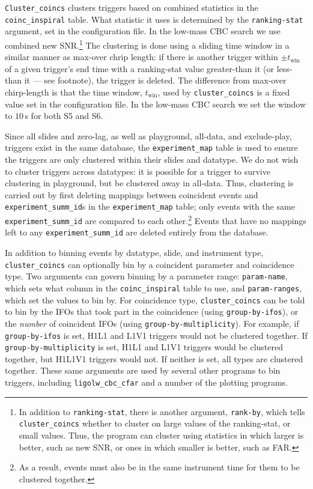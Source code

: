 \verb|Cluster_coincs| clusters triggers based on combined statistics in the \verb|coinc_inspiral| table. What statistic it uses is determined by the \verb|ranking-stat| argument, set in the configuration file. In the low-mass \ac{CBC} search we use combined new \ac{SNR}.\footnote{In addition to \texttt{ranking-stat}, there is another argument, \texttt{rank-by}, which tells \texttt{cluster\_coincs} whether to cluster on large values of the ranking-stat, or small values. Thus, the program can cluster using statistics in which larger is better, such as new \ac{SNR}, or ones in which smaller is better, such as \ac{FAR}.} The clustering is done using a sliding time window in a similar manner as max-over chrip length: if there is another trigger within $\pm t_{\mathrm{win}}$ of a given trigger's end time with a ranking-stat value greater-than it (or less-than it --- see footnote), the trigger is deleted. The difference from max-over chirp-length is that the time window, $t_{\mathrm{win}}$, used by \verb|cluster_coincs| is a fixed value set in the configuration file. In the low-mass \ac{CBC} search we set the window to $10\,$s for both \ac{S5} and \ac{S6}.

Since all slides and zero-lag, as well as playground, all-data, and exclude-play, triggers exist in the same database, the \verb|experiment_map| table is used to ensure the triggers are only clustered within their slides and datatype. We do not wish to cluster triggers across datatypes: it is possible for a trigger to survive clustering in playground, but be clustered away in all-data. Thus, clustering is carried out by first deleting mappings between coincident events and \verb|experiment_summ_id|s in the \verb|experiment_map| table; only events with the same \verb|experiment_summ_id| are compared to each other.\footnote{As a result, events must also be in the same instrument time for them to be clustered together.} Events that have no mappings left to any \verb|experiment_summ_id| are deleted entirely from the database.

In addition to binning events by datatype, slide, and instrument type, \verb|cluster_coincs| can optionally bin by a coincident parameter and coincidence type. Two arguments can govern binning by a parameter range: \verb|param-name|, which sets what column in the \verb|coinc_inspiral| table to use, and \verb|param-ranges|, which set the values to bin by. For coincidence type, \verb|cluster_coincs| can be told to bin by the \acp{IFO} that took part in the coincidence (using \verb|group-by-ifos|), or the \emph{number} of coincident \acp{IFO} (using \verb|group-by-multiplicity|). For example, if \verb|group-by-ifos| is set, H1L1 and L1V1 triggers would not be clustered together. If \verb|group-by-multiplicity| is set, H1L1 and L1V1 triggers would be clustered together, but H1L1V1 triggers would not. If neither is set, all types are clustered together. These same arguments are used by several other programs to bin triggers, including \verb|ligolw_cbc_cfar| and a number of the plotting programs.

